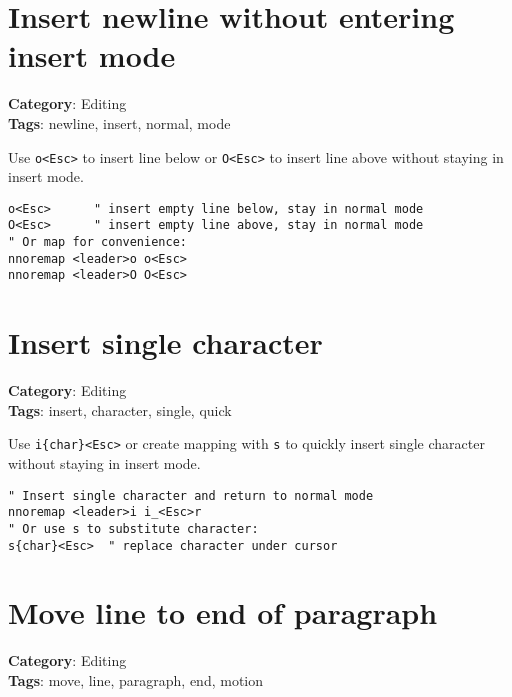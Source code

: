 {{{{{\section{Insert newline without entering insert mode}

\textbf{Category}: Editing\\ \textbf{Tags}: newline, insert, normal, mode
\vspace{0.5cm}

Use {\footnotesize \Verb§o<Esc>§} to insert line below or {\footnotesize \Verb§O<Esc>§} to insert line above without staying in insert mode.

\begin{Exa*}{}
\begin{Verbatim}[fontsize=\footnotesize, breaklines, breakanywhere]
o<Esc>      " insert empty line below, stay in normal mode
O<Esc>      " insert empty line above, stay in normal mode
" Or map for convenience:
nnoremap <leader>o o<Esc>
nnoremap <leader>O O<Esc>
\end{Verbatim}
\end{Exa*}

\section{Insert single character}

\textbf{Category}: Editing\\ \textbf{Tags}: insert, character, single, quick
\vspace{0.5cm}

Use {\footnotesize \Verb§i{char}<Esc>§} or create mapping with {\footnotesize \Verb§s§} to quickly insert single character without staying in insert mode.

\begin{Exa*}{}
\begin{Verbatim}[fontsize=\footnotesize, breaklines, breakanywhere]
" Insert single character and return to normal mode
nnoremap <leader>i i_<Esc>r
" Or use s to substitute character:
s{char}<Esc>  " replace character under cursor
\end{Verbatim}
\end{Exa*}

\section{Move line to end of paragraph}

\textbf{Category}: Editing\\ \textbf{Tags}: move, line, paragraph, end, motion
\vspace{0.5cm}

}}}}}
